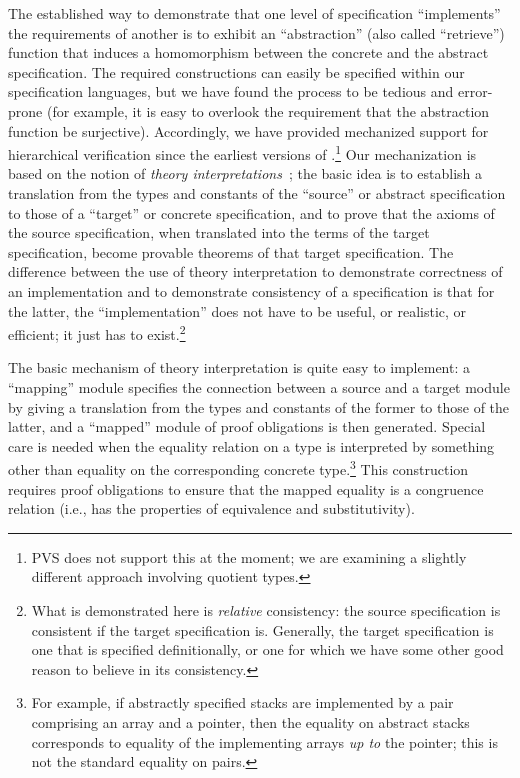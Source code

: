 The established way to demonstrate that one level of specification
``implements'' the requirements of another is to exhibit an
``abstraction'' (also called ``retrieve'') function that induces a
homomorphism between the concrete and the abstract specification.
The required constructions can easily be specified within our
specification languages, but we have found the process to be tedious and
error-prone (for example, it is easy to overlook the requirement that
the abstraction function be surjective).  Accordingly, we
have provided mechanized support for hierarchical verification since
the earliest versions of \ehdm.\footnote{PVS does not support this at
the moment; we are examining a slightly different approach involving
quotient types.} Our mechanization is based on the notion of {\em
theory interpretations\/}~\cite[Section 4.7]{Shoenfield}; the basic
idea is to establish a translation from the types and constants of
the ``source'' or abstract specification to those of a ``target'' or
concrete specification, and to prove that the axioms of the source
specification, when translated into the terms of the target
specification, become provable theorems of that target specification.
The difference between the use of theory interpretation to
demonstrate correctness of an implementation and to demonstrate
consistency of a specification is that for the latter, the
``implementation'' does not have to be useful, or realistic, or
efficient; it just has to exist.\footnote{What is demonstrated here
is {\em relative\/} consistency: the source specification is
consistent if the target specification is.  Generally, the target
specification is one that is specified definitionally, or one for
which we have some other good reason to believe in its consistency.}

The basic mechanism of theory interpretation is quite easy to
implement: a ``mapping'' module specifies the connection between a
source and a target module by giving a translation from the types and
constants of the former to those of the latter, and a ``mapped''
module of proof obligations is then generated.  Special care is needed
when the equality relation on a type is interpreted by something
other than equality on the corresponding concrete type.\footnote{For
example, if abstractly specified stacks are implemented by a pair comprising
an array and a pointer, then the equality on abstract stacks corresponds
to equality of the implementing arrays {\em up to\/} the pointer; this
is not the standard equality on pairs.} This
construction requires proof obligations to ensure that the mapped
equality is a congruence relation (i.e., has the properties of
equivalence and substitutivity).

